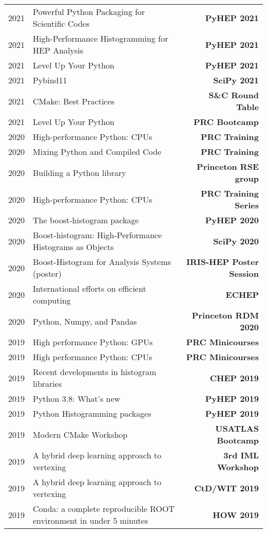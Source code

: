 \documentclass[10pt,letterpaper]{moderncv}
\begin{document}

\begin{tabularx}{\textwidth}{p{.33in}X>{\bfseries}r}
	2021 & Powerful Python Packaging for Scientific Codes & PyHEP 2021 \\
	2021 & High-Performance Histogramming for HEP Analysis & PyHEP 2021 \\
	2021 & Level Up Your Python & PyHEP 2021 \\
	2021 & Pybind11 & SciPy 2021 \\
    2021 & CMake: Best Practices & S\&C Round Table \\
    2021 & Level Up Your Python & PRC Bootcamp \\
    2020 & High-performance Python: CPUs & PRC Training \\
    2020 & Mixing Python and Compiled Code & PRC Training \\
    2020 & Building a Python library & Princeton RSE group \\
    2020 & High-performance Python: CPUs & PRC Training Series \\
    2020 & The boost-histogram package & PyHEP 2020 \\
    2020 & Boost-histogram: High-Performance Histograms as Objects & SciPy 2020 \\
    2020 & Boost-Histogram for Analysis Systems (poster) & IRIS-HEP Poster Session \\
    2020 & International efforts on efficient computing & ECHEP \\
    2020 & Python, Numpy, and Pandas & Princeton RDM 2020 \\
    2019 & High performance Python: GPUs & PRC Minicourses \\
    2019 & High performance Python: CPUs & PRC Minicourses \\
    2019 & Recent developments in histogram libraries  & CHEP 2019 \\ 	
    2019 & Python 3.8: What's new & PyHEP 2019 \\ 	
    2019 & Python Histogramming packages & PyHEP 2019\\ 	
    2019 & Modern CMake Workshop & USATLAS Bootcamp \\ 	
    2019 & A hybrid deep learning approach to vertexing & 3rd IML Workshop \\ 	
    2019 & A hybrid deep learning approach to vertexing & CtD/WIT 2019 \\ 	
    2019 & Conda: a complete reproducible ROOT environment in under 5 minutes & HOW 2019 \\ 	

\end{tabularx}
\end{document}
